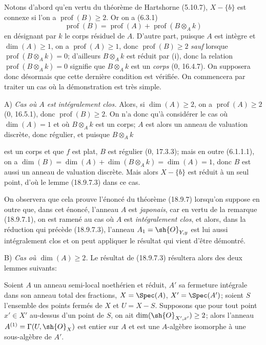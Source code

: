 Notons d'abord qu'en vertu du théorème de Hartshorne (5.10.7), $X-\{b\}$ est connexe si l'on a $\operatorname{prof}(B)\geq 2$. Or on a (6.3.1)
\begin{equation}
  \operatorname{prof}(B)=\operatorname{prof}(A)+\operatorname{prof}(B\otimes_A k)
  \tag{18.9.7.4}
  \label{IV.18.9.7.4}
\end{equation}
en désignant par $k$ le corps résiduel de $A$. D'autre part, puisque $A$ est intègre et $\dim(A)\geq 1$, on a $\operatorname{prof}(A)\geq 1$, donc $\operatorname{prof}(B)\geq 2$ \emph{sauf} lorsque $\operatorname{prof}(B\otimes_A k)=0$; d'ailleurs $B\otimes_A k$ est réduit par (i), donc la relation $\operatorname{prof}(B\otimes_A k)=0$ signifie que $B\otimes_A k$ est un \emph{corps} (0, 16.4.7). On supposera donc désormais que cette dernière condition est vérifiée. On commencera par traiter un cas où la démonstration est très simple.

A) \emph{Cas où $A$ est intégralement clos.} Alors, si $\dim(A)\geq 2$, on a $\operatorname{prof}(A)\geq 2$ (0, 16.5.1), donc $\operatorname{prof}(B)\geq 2$. On n'a donc qu'à considérer le cas où $\dim(A)=1$ et où $B\otimes_A k$ est un corps; $A$ est alors un anneau de valuation discrète, donc régulier, et puisque $B\otimes_A k$


est un corps et que $f$ est plat, $B$ est régulier (0, 17.3.3); mais en outre (6.1.1.1), on a $\dim(B)=\dim(A)+\dim(B\otimes_A k)=\dim(A)=1$, donc $B$ est aussi un anneau de valuation discrète. Mais alors $X-\{b\}$ est réduit à un seul point, d'où le lemme (18.9.7.3) dans ce cas.

On observera que cela prouve l'énoncé du théorème (18.9.7) lorsqu'on suppose en outre que, dans cet énoncé, l'anneau $A$ est \emph{japonais}, car en vertu de la remarque (18.9.7.1), on est ramené au cas où $A$ est \emph{intégralement clos}, et alors, dans la réduction qui précède (18.9.7.3), l'anneau $A_1=\sh{O}_{Y,y}$ est lui aussi intégralement clos et on peut appliquer le résultat qui vient d'être démontré.

B) \emph{Cas où $\dim(A)\geq 2$.} Le résultat de (18.9.7.3) résultera alors des deux lemmes suivants:

\begin{lemma}[18.9.7.5]
\label{IV.18.9.7.5}
Soient $A$ un anneau semi-local noethérien et réduit, $A'$ sa fermeture intégrale dans son anneau total des fractions, $X=\Spec(A)$, $X'=\Spec(A')$; soient $S$ l'ensemble des points fermés de $X$ et $U=X-S$. Supposons que pour tout point $x'\in X'$ au-dessus d'un point de $S$, on ait $\dim(\sh{O}_{X',x'})\geq 2$; alors l'anneau $A^{(1)}=\Gamma(U,\sh{O}_X)$ est entier sur $A$ et est une $A$-algèbre isomorphe à une sous-algèbre de $A'$.
\end{lemma}

